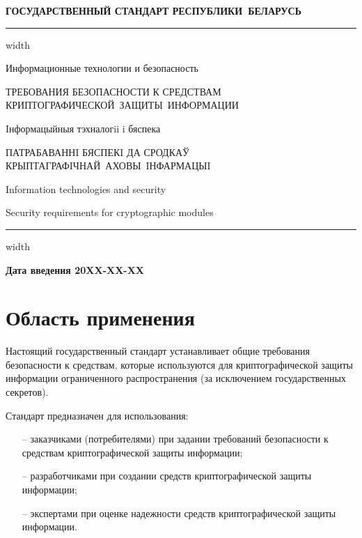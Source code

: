 \newpage
\setcounter{page}{1}
\pagestyle{headings}

\begin{center}
{\bfseries
ГОСУДАРСТВЕННЫЙ СТАНДАРТ РЕСПУБЛИКИ~БЕЛАРУСЬ
\vskip 2pt
\hrule width\textwidth

\vskip 9pt

Информационные технологии и безопасность

ТРЕБОВАНИЯ БЕЗОПАСНОСТИ К СРЕДСТВАМ КРИПТОГРАФИЧЕСКОЙ~ЗАЩИТЫ~ИНФОРМАЦИИ

\vskip 9pt

Iнформацыйныя тэхналогii i бяспека

ПАТРАБАВАННI БЯСПЕКI ДА СРОДКАЎ КРЫПТАГРАФIЧНАЙ~АХОВЫ~IНФАРМАЦЫI
}

\vskip 9pt

Information technologies and security

Security requirements for cryptographic modules

\vskip 4pt                
\hrule width \textwidth
\end{center}

\mbox{}\hfill{\bfseries Дата введения 20XX-XX-XX}

\chapter{Область применения}\label{Scope}

Настоящий государственный стандарт устанавливает общие требования
безопасности к средствам, которые используются для криптографической защиты
информации ограниченного распространения (за исключением государственных
секретов).

Стандарт предназначен для использования:
\begin{itemize}
\item[--]
заказчиками (потребителями) при задании требований безопасности к
средствам криптографической защиты информации;

\item[--]
разработчиками при создании средств криптографической защиты информации;

\item[--]
экспертами при оценке надежности средств криптографической защиты 
информации. 
\end{itemize}



